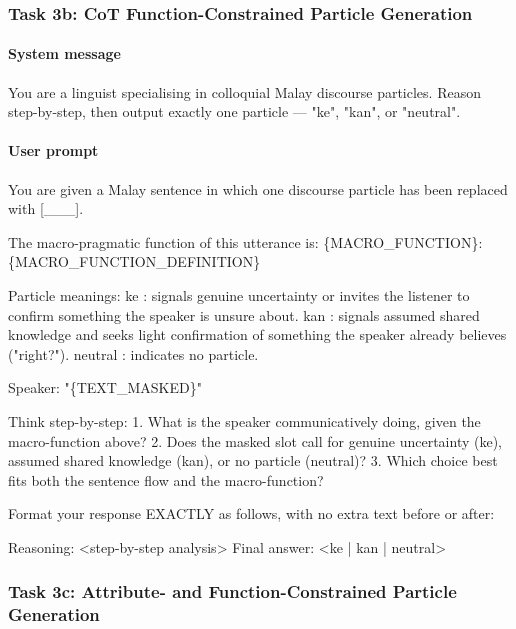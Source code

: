 \documentclass[11pt]{article}
\begin{document}
\subsubsection{Task 3b: CoT Function-Constrained Particle Generation}

\paragraph{System message}
\begin{PromptBlock}
You are a linguist specialising in colloquial Malay discourse particles. Reason step-by-step, then output exactly one particle --- "ke", "kan", or "neutral".
\end{PromptBlock}

\paragraph{User prompt}
\begin{PromptBlock}
You are given a Malay sentence in which one discourse particle has been replaced with [\_\_\_].

The macro-pragmatic function of this utterance is:
  \{MACRO\_FUNCTION\}: \{MACRO\_FUNCTION\_DEFINITION\}

Particle meanings:
  ke      : signals genuine uncertainty or invites the listener to confirm something the speaker is unsure about.
  kan     : signals assumed shared knowledge and seeks light confirmation of something the speaker already believes ("right?").
  neutral : indicates no particle.

Speaker:
  "\{TEXT\_MASKED\}"

Think step-by-step:
  1. What is the speaker communicatively doing, given the macro-function above?
  2. Does the masked slot call for genuine uncertainty (ke), assumed shared knowledge (kan), or no particle (neutral)?
  3. Which choice best fits both the sentence flow and the macro-function?

Format your response EXACTLY as follows, with no extra text before or after:

Reasoning: <step-by-step analysis>
Final answer: <ke | kan | neutral>
\end{PromptBlock}

\subsubsection{Task 3c: Attribute- and Function-Constrained Particle Generation}
\end{document}
